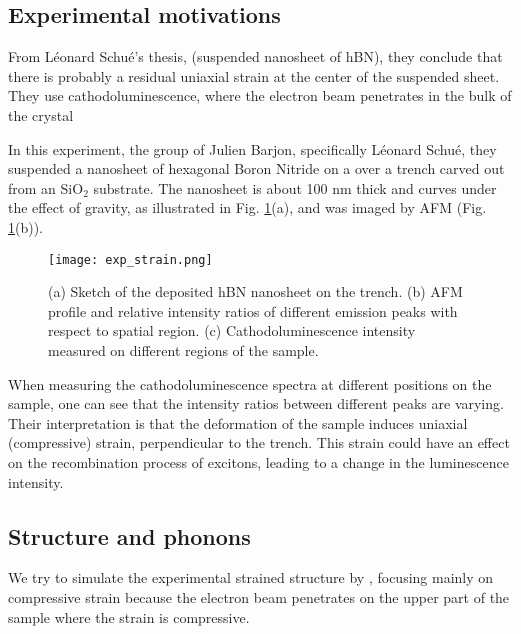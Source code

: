 \subsection{Experimental motivations}
From Léonard Schué's thesis, (suspended nanosheet of hBN), they conclude that there is probably a residual uniaxial strain at the center of the suspended sheet. They use cathodoluminescence, where the electron beam penetrates in the bulk of the crystal

In this experiment, the group of Julien Barjon, specifically Léonard Schué, they suspended a nanosheet of hexagonal Boron Nitride on a over a trench carved out from an SiO$_2$ substrate. The nanosheet is about 100 nm thick and curves under the effect of gravity, as illustrated in Fig. \ref{fig:exp_strain}(a), and was imaged by \gls{AFM} (Fig. \ref{fig:exp_strain}(b)).
\begin{figure}[h!tbp]
	\vspace{0.5cm}
	\setcapindent{2em}
	\centering
	\texttt{[image: exp\_strain.png]}
	\caption{(a) Sketch of the deposited hBN nanosheet on the trench. (b) AFM profile and relative intensity ratios of different emission peaks with respect to spatial region. (c) Cathodoluminescence intensity measured on different regions of the sample.}
	\label{fig:exp_strain}
\end{figure}
When measuring the cathodoluminescence spectra at different positions on the sample, one can see that the intensity ratios between different peaks are varying. Their interpretation is that the deformation of the sample induces uniaxial (compressive) strain, perpendicular to the trench. This strain could have an effect on the recombination process of excitons, leading to a change in the luminescence intensity.
%
%
\subsection{Structure and phonons}
We try to simulate the experimental strained structure by , focusing mainly on compressive strain because the electron beam penetrates on the upper part of the sample where the strain is compressive.